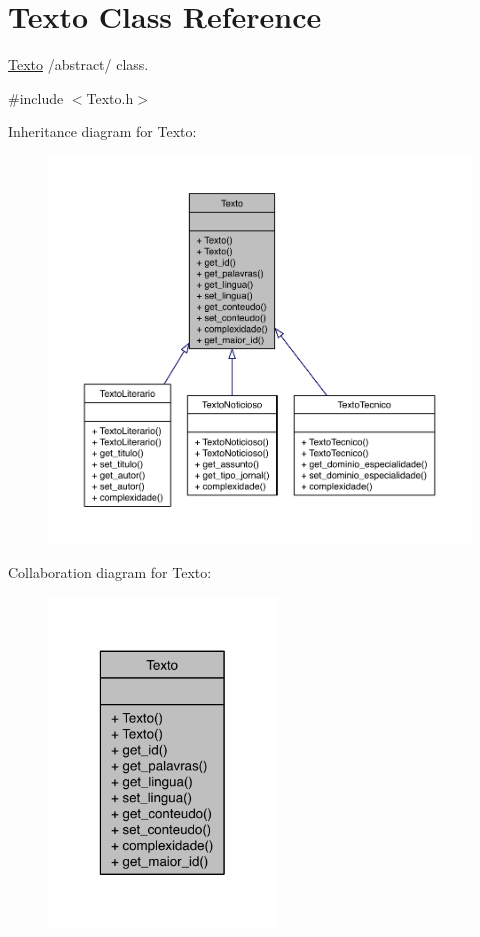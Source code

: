 \hypertarget{class_texto}{\section{Texto Class Reference}
\label{class_texto}
}


\hyperlink{class_texto}{Texto} /abstract/ class.  




{\ttfamily \#include $<$Texto.\-h$>$}



Inheritance diagram for Texto\-:
\nopagebreak
\begin{figure}[H]
\begin{center}
\leavevmode
\includegraphics[width=350pt]{class_texto__inherit__graph}
\end{center}
\end{figure}


Collaboration diagram for Texto\-:
\nopagebreak
\begin{figure}[H]
\begin{center}
\leavevmode
\includegraphics[width=172pt]{class_texto__coll__graph}
\end{center}
\end{figure}
